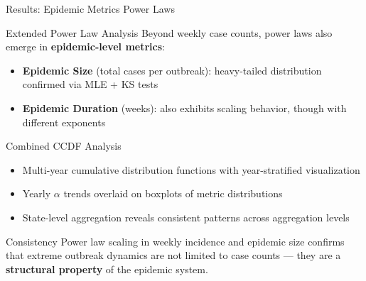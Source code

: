 \documentclass[10pt,aspectratio=169]{beamer}
\begin{document}
\begin{frame}{Results: Epidemic Metrics Power Laws}
\begin{block}{Extended Power Law Analysis}
Beyond weekly case counts, power laws also emerge in \textbf{epidemic-level metrics}:
\begin{itemize}
    \item \textbf{Epidemic Size} (total cases per outbreak): heavy-tailed distribution confirmed via MLE + KS tests
    \item \textbf{Epidemic Duration} (weeks): also exhibits scaling behavior, though with different exponents
\end{itemize}
\end{block}

\vspace{0.3cm}

\begin{block}{Combined CCDF Analysis}
\begin{itemize}
    \item Multi-year cumulative distribution functions with year-stratified visualization
    \item Yearly $\alpha$ trends overlaid on boxplots of metric distributions
    \item State-level aggregation reveals consistent patterns across aggregation levels
\end{itemize}
\end{block}

\begin{alertblock}{Consistency}
Power law scaling in weekly incidence and
epidemic size confirms that extreme outbreak dynamics are not limited to case counts --- they are a \textbf{structural property} of the epidemic system.
\end{alertblock}
\end{frame}
\end{document}
